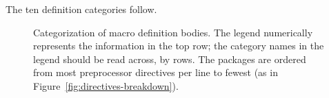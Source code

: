 \documentclass[10pt]{article}
\newcommand{\captionsmall}[1]{\caption[]{\small #1}}
\begin{document}
The ten definition categories follow.  



\begin{figure}
\centerline{}
\captionsmall{Categorization of macro definition bodies.  The legend numerically
  represents the information in the top row; the category names in the
  legend should be read across, by rows.  The packages are ordered from
  most preprocessor directives per line to fewest (as in
  Figure~\ref{fig:directives-breakdown}).}
\label{fig:categorization}
\end{figure}



\label{sec:categorization-details}
\end{document}
